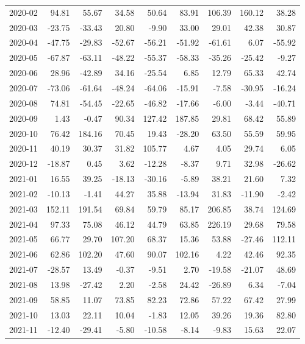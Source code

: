 \begin{table}[ht]
\begin{tabular}{lrrrrrrrr}
  2020-02 & 94.81 & 55.67 & 34.58 & 50.64 & 83.91 & 106.39 & 160.12 & 38.28 \\ 
  2020-03 & -23.75 & -33.43 & 20.80 & -9.90 & 33.00 & 29.01 & 42.38 & 30.87 \\ 
  2020-04 & -47.75 & -29.83 & -52.67 & -56.21 & -51.92 & -61.61 & 6.07 & -55.92 \\ 
  2020-05 & -67.87 & -63.11 & -48.22 & -55.37 & -58.33 & -35.26 & -25.42 & -9.27 \\ 
  2020-06 & 28.96 & -42.89 & 34.16 & -25.54 & 6.85 & 12.79 & 65.33 & 42.74 \\ 
  2020-07 & -73.06 & -61.64 & -48.24 & -64.06 & -15.91 & -7.58 & -30.95 & -16.24 \\ 
  2020-08 & 74.81 & -54.45 & -22.65 & -46.82 & -17.66 & -6.00 & -3.44 & -40.71 \\ 
  2020-09 & 1.43 & -0.47 & 90.34 & 127.42 & 187.85 & 29.81 & 68.42 & 55.89 \\ 
  2020-10 & 76.42 & 184.16 & 70.45 & 19.43 & -28.20 & 63.50 & 55.59 & 59.95 \\ 
  2020-11 & 40.19 & 30.37 & 31.82 & 105.77 & 4.67 & 4.05 & 29.74 & 6.05 \\ 
  2020-12 & -18.87 & 0.45 & 3.62 & -12.28 & -8.37 & 9.71 & 32.98 & -26.62 \\ 
  2021-01 & 16.55 & 39.25 & -18.13 & -30.16 & -5.89 & 38.21 & 21.60 & 7.32 \\ 
  2021-02 & -10.13 & -1.41 & 44.27 & 35.88 & -13.94 & 31.83 & -11.90 & -2.42 \\ 
  2021-03 & 152.11 & 191.54 & 69.84 & 59.79 & 85.17 & 206.85 & 38.74 & 124.69 \\ 
  2021-04 & 97.33 & 75.08 & 46.12 & 44.79 & 63.85 & 226.19 & 29.68 & 79.58 \\ 
  2021-05 & 66.77 & 29.70 & 107.20 & 68.37 & 15.36 & 53.88 & -27.46 & 112.11 \\ 
  2021-06 & 62.86 & 102.20 & 47.60 & 90.07 & 102.16 & 4.22 & 42.46 & 92.35 \\ 
  2021-07 & -28.57 & 13.49 & -0.37 & -9.51 & 2.70 & -19.58 & -21.07 & 48.69 \\ 
  2021-08 & 13.98 & -27.42 & 2.20 & -2.58 & 24.42 & -26.89 & 6.34 & -7.04 \\ 
  2021-09 & 58.85 & 11.07 & 73.85 & 82.23 & 72.86 & 57.22 & 67.42 & 27.99 \\ 
  2021-10 & 13.03 & 22.11 & 10.04 & -1.83 & 12.05 & 39.26 & 19.36 & 82.80 \\ 
  2021-11 & -12.40 & -29.41 & -5.80 & -10.58 & -8.14 & -9.83 & 15.63 & 22.07 \\ 

\end{tabular}
\end{table}
